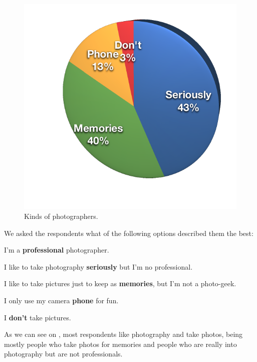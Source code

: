 \begin{figure}
	\vspace{-20pt}
	\begin{center}
		\includegraphics[width=\linewidth]{Figures/survey/desc}
	\end{center}
	\vspace{-20pt}
	\caption{Kinds of photographers.}
	\vspace{-5pt}
	\label{fig:us:desc}
\end{figure}

We asked the respondents what of the following options described them the best:

\begin{myitemize}
	\item I'm a \textbf{professional} photographer.
	\item I like to take photography \textbf{seriously} but I'm no professional.
	\item I like to take pictures just to keep as \textbf{memories}, but I'm not a photo-geek.
	\item I only use my camera \textbf{phone} for fun.
	\item I \textbf{don't} take pictures.
\end{myitemize}

As we can see on , most respondents like photography and take photos, being mostly people who take photos for memories and people who are really into photography but are not professionals.

